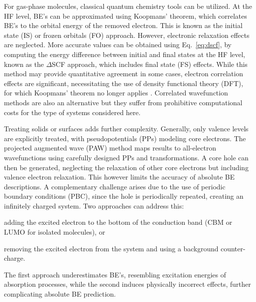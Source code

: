 \documentclass[%
aip,
amsmath,amssymb,
preprint,%
jcp,
showkeys,
]{revtex4-2}
\begin{document}
For gas-phase molecules, classical quantum chemistry tools can be utilized. At the HF level, BE's can be approximated using Koopmans' theorem, which correlates BE's to the orbital energy of the removed electron. This is known as the initial state (IS) or frozen orbitals (FO) approach.\cite{pueyobellafontPredictionCoreLevel2015} However, electronic relaxation effects are neglected. More accurate values can be obtained using Eq.~\eqref{eq:dscf}, by computing the energy difference between initial and final states at the HF level, known as the $\Delta$SCF approach, which includes final state (FS) effects. While this method may provide quantitative agreement in some cases, electron correlation effects are significant, necessitating the use of density functional theory (DFT), for which Koopmans' theorem no longer applies \cite{pueyobellafontPredictionCoreLevel2015,pueyobellafontPredictingCoreLevel2017,kleinNutsBoltsCorehole2021}. Correlated wavefunction methods are also an alternative but they suffer from prohibitive computational costs for the type of systems considered here.

Treating solids or surfaces adds further complexity.\cite{garcia-gilCalculationCoreLevel2012,bagusXrayPhotoelectronSpectroscopy2024} Generally, only valence levels are explicitly treated, with pseudopotentials (PPs) modeling core electrons. The projected augmented wave (PAW) method maps results to all-electron wavefunctions using carefully designed PPs and transformations\cite{blochlProjectorAugmentedwaveMethod1994}. A core hole can then be generated, neglecting the relaxation of other core electrons but including valence electron relaxation\cite{garcia-gilCalculationCoreLevel2012}. This however limits the accuracy of absolute BE descriptions.
A complementary challenge arises due to the use of periodic boundary conditions (PBC), since the hole is periodically repeated, creating an infinitely charged system. Two approaches can address this: 
\begin{inparaenum}[(i)]
	\item adding the excited electron to the bottom of the conduction band (CBM or LUMO for isolated molecules), or 
	\item removing the excited electron from the system and using a background counter-charge.
\end{inparaenum}
The first approach underestimates BE's, resembling excitation energies of absorption processes, while the second induces physically incorrect effects, further complicating absolute BE prediction.\cite{olovssonCorelevelShiftsComplex2006,garcia-gilCalculationCoreLevel2012,pueyobellafontPerformanceTPSSFunctional2016,pueyobellafontPredictingCoreLevel2017,taucherFinalStateSimulationsCoreLevel2020}
\end{document}
